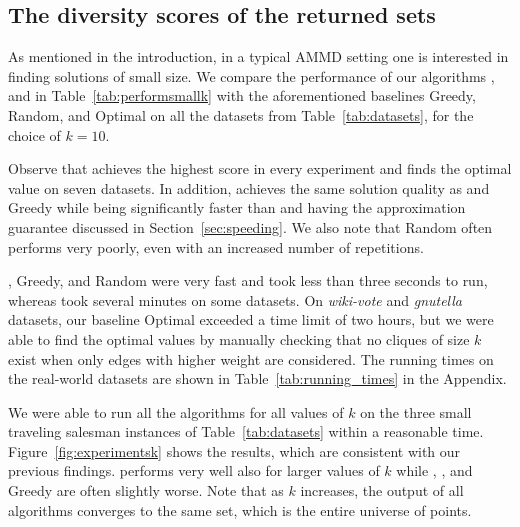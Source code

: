 \subsection{The diversity scores of the returned sets}
\label{exp:per}

As mentioned in the introduction, in a typical AMMD setting one is interested in finding solutions of small size.
We compare the performance of our algorithms \algbac{}, \algbacb{} and \algbacf{} in Table~\ref{tab:performsmallk} with the aforementioned baselines Greedy, Random, and Optimal on all the datasets from Table~\ref{tab:datasets}, for the choice of $k=10$. 

Observe that \algbacb{} achieves the highest score in every experiment and finds the optimal value on seven datasets. In addition, \algbacf{} achieves the same solution quality as \algbac{} and Greedy while being significantly faster than \algbac{} and having the approximation guarantee discussed in Section~\ref{sec:speeding}. We also note that Random often performs very poorly, even with an increased number of repetitions. 

\algbacf{}, Greedy, and Random were very fast and took less than three seconds to run, whereas \algbacb{} took several minutes on some datasets. On \emph{wiki-vote} and \emph{gnutella} datasets, our baseline Optimal exceeded a time limit of two hours, but we were able to find the optimal values by manually checking that no cliques of size $k$ exist when only edges with higher weight are considered.  The running times on the real-world datasets are shown in Table~\ref{tab:running_times} in the Appendix.


We were able to run all the algorithms for all values of $k$ on the three small traveling salesman instances of Table~\ref{tab:datasets} within a reasonable time.
Figure~\ref{fig:experimentsk} shows the results, which are consistent with our previous findings. \algbacb{} performs very well also for larger values of $k$ while \algbac{}, \algbacf{}, and Greedy are often slightly worse. Note that as $k$ increases, the output of all algorithms converges to the same set, which is the entire universe of points.



